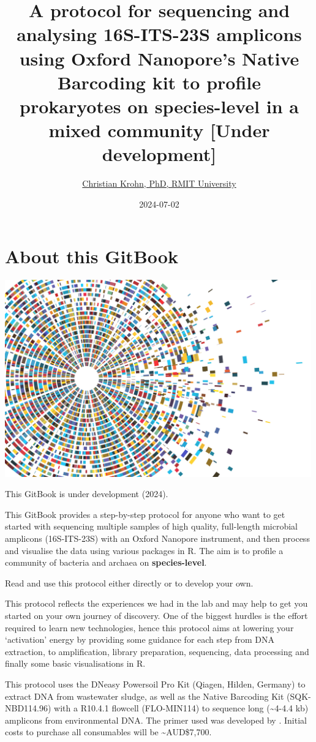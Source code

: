 \documentclass[
]{book}
\title{A protocol for sequencing and analysing 16S-ITS-23S amplicons using Oxford Nanopore's Native Barcoding kit to profile prokaryotes on species-level in a mixed community {[}Under development{]}}
\author{\href{https://www.rmit.edu.au/contact/staff-contacts/academic-staff/k/krohn---christian}{Christian Krohn, PhD, RMIT University}}
\date{2024-07-02}
\begin{document}
\maketitle

{
\setcounter{tocdepth}{1}
\tableofcontents
}
\chapter{About this GitBook}\label{about}

\includegraphics[width=5.20833in,height=\textheight]{./img/vectorstock_23650232.jpg}

This GitBook is under development (2024).

This GitBook provides a step-by-step protocol for anyone who want to get started with sequencing multiple samples of high quality, full-length microbial amplicons (16S-ITS-23S) with an Oxford Nanopore instrument, and then process and visualise the data using various packages in R. The aim is to profile a community of bacteria and archaea on \textbf{species-level}.

Read and use this protocol either directly or to develop your own.

This protocol reflects the experiences we had in the lab and may help to get you started on your own journey of discovery. One of the biggest hurdles is the effort required to learn new technologies, hence this protocol aims at lowering your `activation' energy by providing some guidance for each step from DNA extraction, to amplification, library preparation, sequencing, data processing and finally some basic visualisations in R.

This protocol uses the DNeasy Powersoil Pro Kit (Qiagen, Hilden, Germany) to extract DNA from wastewater sludge, as well as the Native Barcoding Kit (SQK-NBD114.96) with a R10.4.1 flowcell (FLO-MIN114) to sequence long (\textasciitilde4-4.4 kb) amplicons from environmental DNA. The primer used was developed by \citep{Martijn2019}. Initial costs to purchase all consumables will be \textasciitilde AUD\$7,700.
\end{document}
